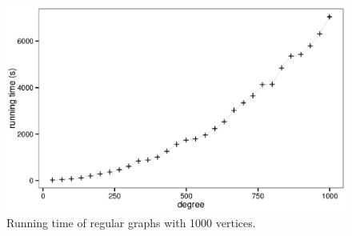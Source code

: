 \documentclass{article}
\begin{document}
\begin{figure}[!htb]
\label{fig:regular}
{\centering \includegraphics[width=1\textwidth]{regular} 
\caption{Running time of regular graphs with 1000 vertices.}
}
\end{figure}















\end{document}
